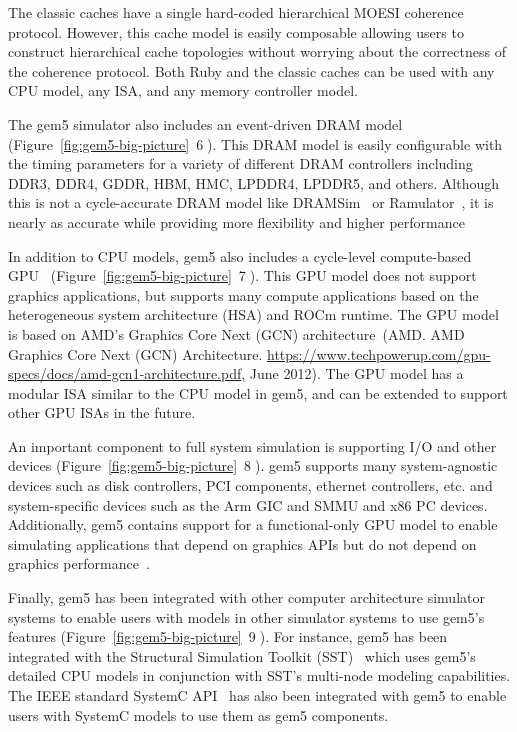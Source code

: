 The classic caches have a single hard-coded hierarchical MOESI coherence protocol.
However, this cache model is easily composable allowing users to construct hierarchical cache topologies without worrying about the correctness of the coherence protocol.
Both Ruby and the classic caches can be used with any CPU model, any ISA, and any memory controller model.

The gem5 simulator also includes an event-driven DRAM model (Figure~\ref{fig:gem5-big-picture}~\textcircled{6}).
This DRAM model is easily configurable with the timing parameters for a variety of different DRAM controllers including DDR3, DDR4, GDDR, HBM, HMC, LPDDR4, LPDDR5, and others.
Although this is not a cycle-accurate DRAM model like DRAMSim~\cite{dramsim, dramsim2, dramsim3} or Ramulator~\cite{ramulator}, it is nearly as accurate while providing more flexibility and higher performance~\cite{hansson-ispass-paper}

In addition to CPU models, gem5 also includes a cycle-level compute-based GPU~\cite{} (Figure~\ref{fig:gem5-big-picture}~\textcircled{7}).
This GPU model does not support graphics applications, but supports many compute applications based on the heterogeneous system architecture (HSA) and ROCm runtime.
The GPU model is based on AMD's Graphics Core Next (GCN) architecture~\cite{}(AMD. AMD Graphics Core Next (GCN) Architecture. \url{https://www.techpowerup.com/gpu-specs/docs/amd-gcn1-architecture.pdf}, June 2012).
The GPU model has a modular ISA similar to the CPU model in gem5, and can be extended to support other GPU ISAs in the future.

An important component to full system simulation is supporting I/O and other devices (Figure~\ref{fig:gem5-big-picture}~\textcircled{8}).
gem5 supports many system-agnostic devices such as disk controllers, PCI components, ethernet controllers, etc. and system-specific devices such as the Arm GIC and SMMU and x86 PC devices.
Additionally, gem5 contains support for a functional-only GPU model to enable simulating applications that depend on graphics APIs but do not depend on graphics performance~\cite{nomali}.

Finally, gem5 has been integrated with other computer architecture simulator systems to enable users with models in other simulator systems to use gem5's features (Figure~\ref{fig:gem5-big-picture}~\textcircled{9}).
For instance, gem5 has been integrated with the Structural Simulation Toolkit (SST)~\cite{sst-gem5} which uses gem5's detailed CPU models in conjunction with SST's multi-node modeling capabilities.
The IEEE standard SystemC API~\cite{menard2017-system-systemc} has also been integrated with gem5 to enable users with SystemC models to use them as gem5 components.

